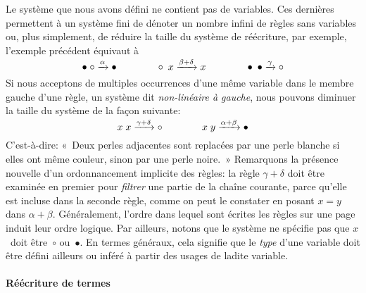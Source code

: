 Le système que nous avons défini ne contient pas de variables. Ces
dernières permettent à un système fini de dénoter un nombre infini de
règles sans variables ou, plus simplement, de réduire la taille du
système de réécriture, par exemple, l'exemple précédent équivaut à
\begin{equation*}
\bullet \; \circ \xrightarrow{\smash{\alpha}} \bullet
\qquad\qquad
\circ \; x \xrightarrow{\smash{\beta+\delta}} x
\qquad\qquad
\bullet \; \bullet \xrightarrow{\smash{\gamma}} \circ
\end{equation*}
Si nous acceptons de multiples occurrences d'une même variable dans le
membre gauche d'une règle, un système dit \emph{non-linéaire à
  gauche}, nous pouvons
diminuer la taille du système de la façon suivante:
\begin{equation*}
x  \; x \xrightarrow{\smash{\gamma+\delta}} \circ\qquad\qquad
x  \; y \xrightarrow{\smash{\alpha+\beta}} \bullet
\end{equation*}
C'est-à-dire: «~Deux perles adjacentes sont replacées par une perle
blanche si elles ont même couleur, sinon par une perle noire.~»
Remarquons la présence nouvelle d'un ordonnancement implicite des
règles: la règle \(\gamma+\delta\) doit être examinée en premier pour
\emph{filtrer} une partie de la chaîne courante, parce qu'elle est
incluse dans la seconde règle, comme on peut le constater en posant
\(x=y\) dans \(\alpha+\beta\). Généralement, l'ordre dans lequel sont
écrites les règles sur une page induit leur ordre logique. Par
ailleurs, notons que le système ne spécifie pas que \(x\)~doit
être~\(\circ\) ou~\(\bullet\). En termes généraux, cela signifie que
le \emph{type} d'une variable doit être défini ailleurs ou inféré à
partir des usages de ladite variable.

\paragraph{Réécriture de termes}

